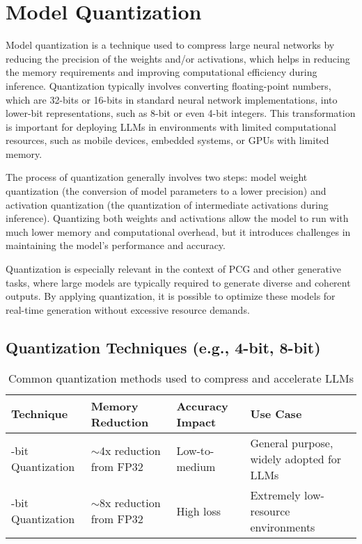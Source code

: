 \section{Model Quantization}

Model quantization is a technique used to compress large neural networks by reducing the
precision of the weights and/or activations, which helps in reducing the memory requirements
and improving computational efficiency during inference. Quantization typically
involves converting floating-point numbers, which are 32-bits or 16-bits in standard neural
network implementations, into lower-bit representations, such as 8-bit or even 4-bit
integers. This transformation is important for deploying LLMs in environments with limited
computational resources, such as mobile devices, embedded systems, or GPUs with
limited memory.

The process of quantization generally involves two steps: model weight quantization
(the conversion of model parameters to a lower precision) and activation quantization (the
quantization of intermediate activations during inference). Quantizing both weights and
activations allow the model to run with much lower memory and computational overhead,
but it introduces challenges in maintaining the model's performance and accuracy.

Quantization is especially relevant in the context of PCG and other generative tasks,
where large models are typically required to generate diverse and coherent outputs. By
applying quantization, it is possible to optimize these models for real-time generation
without excessive resource demands.

\subsection{Quantization Techniques (e.g., 4-bit, 8-bit)}

\begin{table}[t]
  \centering
  \scriptsize
  \renewcommand{\arraystretch}{1.3}
  \begin{tabularx}{0.95\textwidth}{
    >{\raggedright\arraybackslash}p{3.5cm}
    >{\centering\arraybackslash}p{3.5cm}
    >{\centering\arraybackslash}p{3cm}
    >{\raggedright\arraybackslash}X
  }
    \toprule
    \textbf{Technique} & \textbf{Memory Reduction} & \textbf{Accuracy Impact} & \textbf{Use Case} \\
    \midrule
    8-bit Quantization & $\sim$4x reduction from FP32 & Low-to-medium & General purpose, widely adopted for LLMs \\
    4-bit Quantization & $\sim$8x reduction from FP32 & High loss & Extremely low-resource environments \\
    \bottomrule
  \end{tabularx}
  \caption{Common quantization methods used to compress and accelerate LLMs}
  \label{table:common_quant}
\end{table}

